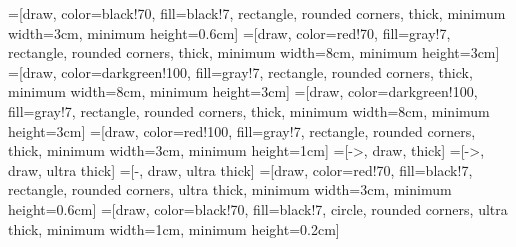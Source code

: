 \usepackage{graphicx}
\usepackage{beamerthemesplit} %
\usepackage{tikz}
\usepackage{multimedia} %

=[draw, color=black!70, fill=black!7, rectangle, rounded
corners, thick, minimum width=3cm, minimum height=0.6cm]
=[draw, color=red!70, fill=gray!7, rectangle, rounded
corners, thick, minimum width=8cm, minimum height=3cm]
=[draw, color=darkgreen!100, fill=gray!7, rectangle, rounded
corners, thick, minimum width=8cm, minimum height=3cm]
=[draw, color=darkgreen!100, fill=gray!7, rectangle, rounded
corners, thick, minimum width=8cm, minimum height=3cm]
=[draw, color=red!100, fill=gray!7, rectangle, rounded
corners, thick, minimum width=3cm, minimum height=1cm]
=[->, draw, thick]
=[->, draw, ultra thick]
=[-, draw, ultra thick]
=[draw, color=red!70, fill=black!7, rectangle, rounded
corners, ultra thick, minimum width=3cm, minimum height=0.6cm]
=[draw, color=black!70, fill=black!7, circle, rounded
corners, ultra thick, minimum width=1cm, minimum height=0.2cm]
\newcommand\framepicture[1]{
\begin{center}
		\begin{tikzpicture}
			\node[taskRect] at (0,3) {
			\begin{minipage}[t][4cm]{7cm}
		\texttt{[image: \#1]} 
		\end{minipage}
		};
	\end{tikzpicture}
\end{center}
}
\newcommand\drawDirectedGraph[2]{
\node[nUnit] (h) at (#2,#1) {h};
\node[nUnit] (v1) at (#2-1,#1-2) {v1};
\node[nUnit] (v2) at (#2+1,#1-2) {v2};
\draw[darrow] (v1) -- (h);
\draw[darrow] (v2) -- (h);
\draw[darrow] (h) -- (#2,#1+1);
}
\newcommand\drawUndirectedGraph[2]{
	\node[nUnit] (uh) at (#2,#1) {h};
	\node[nUnit] (uv1) at (#2-1,#1-2) {v1};
	\node[nUnit] (uv2) at (#2+1,#1-2) {v2};
	\draw[uarrow] (uv1) -- (uh);
	\draw[uarrow] (uv2) -- (uh);
}
